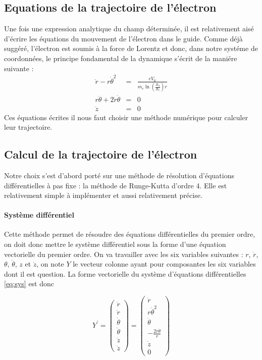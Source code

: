 \documentclass[a4paper,12pt]{article}
\begin{document}
\subsection{Equations de la trajectoire de l'électron}

Une fois une expression analytique du champ déterminée, il est relativement aisé d'écrire les équations du mouvement de l'électron dans le guide. Comme déjà suggéré, l'électron est soumis à la force de Lorentz et donc, dans notre systéme de coordonnées, le principe fondamental de la dynamique s'écrit de la maniére suivante :
\begin{eqnarray}
\ddot{r} - r \dot{\theta}^2 &=& \frac{e V_0}{m_e \ln(\frac{R_2}{R_1}) r} \\
r \ddot{\theta} + 2 \dot{r} \dot{\theta} &=& 0\\
\ddot{z} &=& 0
\label{eq:sys}
\end{eqnarray}
Ces équations écrites il nous faut choisir une méthode numérique pour calculer leur trajectoire.

\subsection{Calcul de la trajectoire de l'électron}
\label{subsection:lol}

Notre choix s'est d'abord porté sur une méthode de résolution d'équations différentielles à pas fixe : la méthode de Runge-Kutta d'ordre 4. Elle est relativement simple à implémenter et aussi relativement précise.

\paragraph{Système différentiel} Cette méthode permet de résoudre des équations différentielles du premier ordre, on doit donc mettre le système différentiel sous la forme d'une équation vectorielle du premier ordre. On va travailler avec les six variables suivantes : $r$, $\dot{r}$, $\theta$, $\dot{\theta}$, $z$ et $\dot{z}$, on note $Y$ le vecteur colonne ayant pour composantes les six variables dont il est question. La forme vectorielle du système d'équations différentielles \eqref{eq:sys} est donc

\[
Y^{\prime}
=
\begin{pmatrix}
\dot r\\
\ddot r\\
\dot \theta\\
\ddot \theta\\
\dot z\\
\ddot z
\end{pmatrix}
=
\begin{pmatrix}
\dot r\\
r \dot{\theta}^2\\
\dot{\theta}\\
- \frac{2 \dot r \dot \theta}{r}\\
\dot{z}\\
0
\end{pmatrix}
\]
\end{document}
